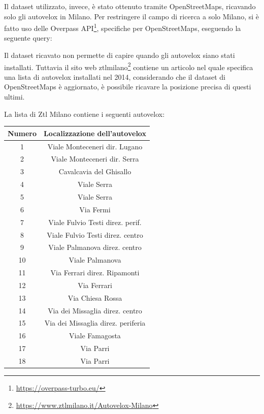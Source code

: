 \documentclass[a4paper]{report}
\begin{document}
Il dataset utilizzato, invece, è stato ottenuto tramite OpenStreetMaps, ricavando solo gli autovelox 
in Milano. 
Per restringere il campo di ricerca a solo Milano, si è fatto uso delle Overpass API\footnote{\url{https://overpass-turbo.eu/}}, 
specifiche per OpenStreetMaps, eseguendo la seguente query: 



Il dataset ricavato non permette di capire quando gli autovelox siano stati installati.
Tuttavia il sito web ztlmilano\footnote{\url{https://www.ztlmilano.it/Autovelox-Milano}} 
contiene un articolo nel quale specifica una lista di 
autovelox installati nel 2014, considerando che il dataset di OpenStreetMaps è aggiornato, 
è possibile ricavare la posizione precisa di questi ultimi.

La lista di Ztl Milano contiene i seguenti autovelox: 

\begin{center}
    \def\arraystretch{1.5}%
    \begin{tabular}{ |c|c| } 
    \hline
    Numero & Localizzazione dell'autovelox \\ 
    \hline
    \rowcolor{TableGray}
    1   &   Viale Monteceneri  dir. Lugano\\
    2   &   Viale Monteceneri dir. Serra\\
    \rowcolor{TableGray}
    3   &   Cavalcavia del Ghisallo\\
    4   &   Viale Serra \\
    \rowcolor{TableGray}
    5   &   Viale Serra\\
    6   &   Via Fermi\\
    \rowcolor{TableGray}
    7   &   Viale Fulvio Testi direz. perif.\\
    8   &   Viale Fulvio Testi direz. centro\\
    \rowcolor{TableGray}
    9   &   Viale Palmanova  direz. centro\\
    10  &   Viale Palmanova\\
    \rowcolor{TableGray}
    11  &   Via Ferrari direz. Ripamonti\\
    12  &   Via Ferrari\\
    \rowcolor{TableGray}
    13  &   Via Chiesa Rossa\\
    14  &   Via dei Missaglia direz. centro\\
    \rowcolor{TableGray}
    15  &   Via dei Missaglia direz. periferia\\
    16  &   Viale Famagosta\\
    \rowcolor{TableGray}
    17  &   Via Parri\\
    18  &   Via Parri\\
    \hline
    \end{tabular}
\end{center}
\end{document}
